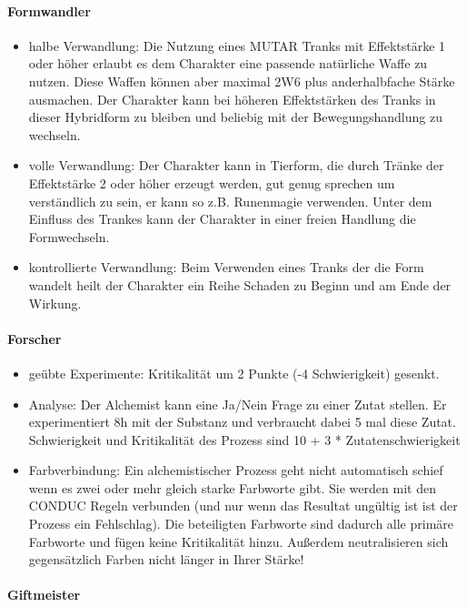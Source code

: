 \documentclass{article}
\begin{document}
\paragraph{Formwandler}

\begin{itemize}
\item halbe Verwandlung: Die Nutzung eines MUTAR Tranks mit Effektstärke 1 oder höher erlaubt es dem Charakter eine passende natürliche Waffe zu nutzen. Diese Waffen können aber maximal 2W6 plus anderhalbfache Stärke ausmachen. Der Charakter kann bei höheren Effektstärken des Tranks in dieser Hybridform zu bleiben und beliebig mit der Bewegungshandlung zu wechseln.
\item volle Verwandlung: Der Charakter kann in Tierform, die durch Tränke der Effektstärke 2 oder höher erzeugt werden, gut genug sprechen um verständlich zu sein, er kann so z.B. Runenmagie verwenden. Unter dem Einfluss des Trankes kann der Charakter in einer freien Handlung die Formwechseln.
\item kontrollierte Verwandlung: Beim Verwenden eines Tranks der die Form wandelt heilt der Charakter ein Reihe Schaden zu Beginn und am Ende der Wirkung.
\end{itemize}

\paragraph{Forscher}

\begin{itemize}
\item geübte Experimente: Kritikalität um 2 Punkte (-4 Schwierigkeit) gesenkt.
\item Analyse: Der Alchemist kann eine Ja/Nein Frage zu einer Zutat stellen. Er experimentiert 8h mit der Substanz und verbraucht dabei 5 mal diese Zutat. Schwierigkeit und Kritikalität des Prozess sind 10 + 3 * Zutatenschwierigkeit
\item Farbverbindung: Ein alchemistischer Prozess geht nicht automatisch schief wenn es zwei oder mehr gleich starke Farbworte gibt. Sie werden mit den CONDUC Regeln verbunden (und nur wenn das Resultat ungültig ist ist der Prozess ein Fehlschlag). Die beteiligten Farbworte sind dadurch alle primäre Farbworte und fügen keine Kritikalität hinzu. Außerdem neutralisieren sich gegensätzlich Farben nicht länger in Ihrer Stärke!
\end{itemize}

\paragraph{Giftmeister}
\end{document}
